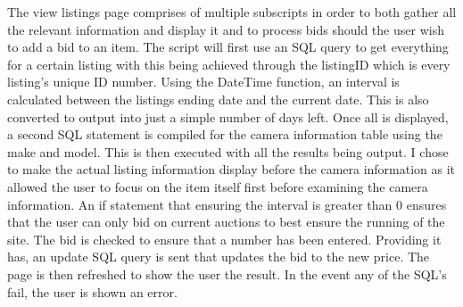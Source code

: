 The view listings page comprises of multiple subscripts in order to both gather all the relevant information and display it and to process bids should the user wish to add a bid to an item. The script will first use an SQL query to get everything for a certain listing with this being achieved through the listingID which is every listing’s unique ID number. Using the DateTime function, an interval is calculated between the listings ending date and the current date. This is also converted to output into just a simple number of days left. Once all is displayed, a second SQL statement is compiled for the camera information table using the make and model. This is then executed with all the results being output. I chose to make the actual listing information display before the camera information as it allowed the user to focus on the item itself first before examining the camera information. An if statement that ensuring the interval is greater than 0 ensures that the user can only bid on current auctions to best ensure the running of the site. The bid is checked to ensure that a number has been entered. Providing it has, an update SQL query is sent that updates the bid to the new price. The page is then refreshed to show the user the result. In the event any of the SQL’s fail, the user is shown an error.

